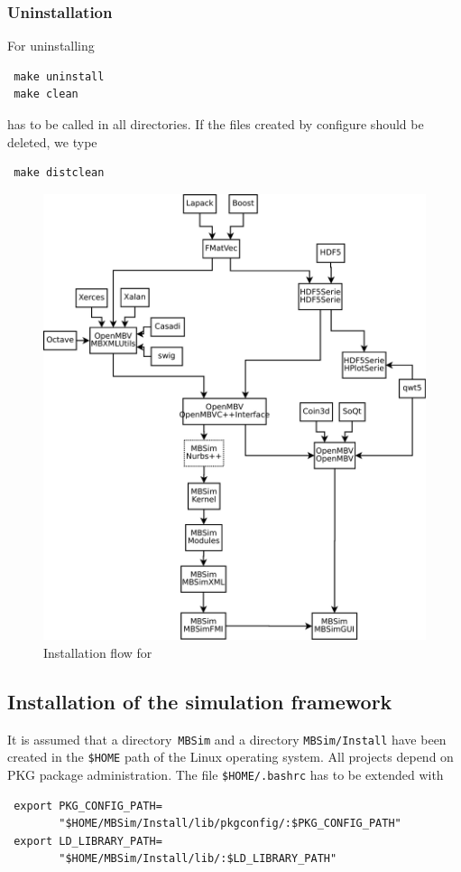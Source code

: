 \subsubsection{Uninstallation}
For uninstalling
\begin{verbatim}
 make uninstall
 make clean
\end{verbatim}
has to be called in all directories. If the files created by configure should be deleted, we type 
\begin{verbatim} 
 make distclean 
\end{verbatim} 
%
\begin{figure}[hbt]%
	\centering
    \footnotesize
    \includegraphics[width=0.95\hsize]{Figures/mbsim_install_flow.pdf}
    \caption{Installation flow for \MBSim{}}
    \label{fig:departure:mbsim:install_flow}
\end{figure}
%
\cleardoublepage
%
\subsection{Installation of the simulation framework\label{sec:install:simulation}}
It is assumed that a directory~\texttt{MBSim} and a directory \texttt{MBSim/Install} have been created in the \texttt{\$HOME} path of the Linux operating system. All projects depend on PKG package administration. The file \texttt{\$HOME/.bashrc} has to be extended with
\begin{verbatim}
 export PKG_CONFIG_PATH=
        "$HOME/MBSim/Install/lib/pkgconfig/:$PKG_CONFIG_PATH"
 export LD_LIBRARY_PATH=
        "$HOME/MBSim/Install/lib/:$LD_LIBRARY_PATH"
\end{verbatim}

